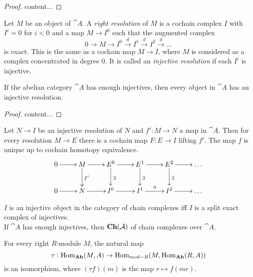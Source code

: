 \begin{proof}
	content...
\end{proof}

\begin{definition}
	Let $M$ be an object of $\cat{A}$.
	A \textit{right resolution} of $M$ is a cochain complex $I$ with $I^i=0$ for $i<0$ and a map $M\rightarrow I^0$ such that the augmented complex
	$$0 \rightarrow M \rightarrow I^0 \overset{d}{\rightarrow} I^1 \overset{d}{\rightarrow} I^2 \overset{d}{\rightarrow} \dots$$
	is exact.
	This is the same as a cochain map $M\rightarrow I$, where $M$ is considered as a complex concentrated in degree $0$.
	It is called an \textit{injective resolution} if each $I^i$ is injective.
\end{definition}

\begin{lemma}
	If the abelian category $\cat{A}$ has enough injectives, then every object in $\cat{A}$ has an injective resolution.
\end{lemma}

\begin{proof}
	content...
\end{proof}

\begin{theorem}
	Let $N\rightarrow I$ be an injective resolution of $N$ and $f':M\rightarrow N$ a map in $\cat{A}$. Then for every resolution $M\rightarrow E$ there is a cochain map $F:E\rightarrow I$ lifting $f'$.
	The map $f$ is unique up to cochain homotopy equivalence.
	\begin{align*}
		\xymatrix{
			0 \ar[r] &M \ar[r] \ar[d]^{f'} &E^0 \ar[r] \ar[d]^{\exists} &E^1 \ar[r] \ar[d]^{\exists} &E^2 \ar[r] \ar[d]^{\exists} &\dots \\
			0 \ar[r] &N \ar[r] &I^0 \ar[r] &I^1 \ar[r]^{\eta} &I^2 \ar[r] &\dots
		}
	\end{align*}
\end{theorem}

\begin{exercise}
	$I$ is an injective object in the category of chain complexes iff $I$ is a split exact complex of injectives. \\
	If $\cat{A}$ has enough injectives, then $\operatorname{\textbf{Ch}}(\mathcal{A})$ of chain complexes over $\cat{A}$.
\end{exercise}

\begin{lemma}
	For every right $R$-module $M$, the natural map
	$$\tau:\operatorname{Hom}_{\operatorname{\textbf{Ab}}}(M,A)\rightarrow\operatorname{Hom}_{mod-R}(M,\operatorname{Hom}_{\operatorname{\textbf{Ab}}}(R,A))$$
	is an isomorphism, where $(\tau f)(m)$ is the map $r\mapsto f(mr)$.
\end{lemma}

